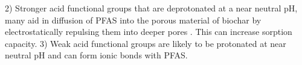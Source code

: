 2) Stronger acid functional groups that are deprotonated at a near neutral pH, many aid in diffusion of PFAS into the porous material of biochar by electrostatically repulsing them into deeper pores \citep{du2014adsorption}. This can increase sorption capacity. 3) Weak acid functional groups are likely to be protonated at near neutral pH and can form ionic bonds with PFAS. 